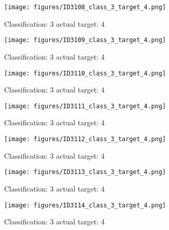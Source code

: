 \begin{figure}[h!]
\begin{center}
\texttt{[image: figures/ID3108\_class\_3\_target\_4.png]}
\end{center}
\caption{ Classification: 3 actual target: 4}
\label{fig:ID3108_class_3_target_4}
\end{figure}
\begin{figure}[h!]
\begin{center}
\texttt{[image: figures/ID3109\_class\_3\_target\_4.png]}
\end{center}
\caption{ Classification: 3 actual target: 4}
\label{fig:ID3109_class_3_target_4}
\end{figure}
\begin{figure}[h!]
\begin{center}
\texttt{[image: figures/ID3110\_class\_3\_target\_4.png]}
\end{center}
\caption{ Classification: 3 actual target: 4}
\label{fig:ID3110_class_3_target_4}
\end{figure}
\begin{figure}[h!]
\begin{center}
\texttt{[image: figures/ID3111\_class\_3\_target\_4.png]}
\end{center}
\caption{ Classification: 3 actual target: 4}
\label{fig:ID3111_class_3_target_4}
\end{figure}
\begin{figure}[h!]
\begin{center}
\texttt{[image: figures/ID3112\_class\_3\_target\_4.png]}
\end{center}
\caption{ Classification: 3 actual target: 4}
\label{fig:ID3112_class_3_target_4}
\end{figure}
\begin{figure}[h!]
\begin{center}
\texttt{[image: figures/ID3113\_class\_3\_target\_4.png]}
\end{center}
\caption{ Classification: 3 actual target: 4}
\label{fig:ID3113_class_3_target_4}
\end{figure}
\begin{figure}[h!]
\begin{center}
\texttt{[image: figures/ID3114\_class\_3\_target\_4.png]}
\end{center}
\caption{ Classification: 3 actual target: 4}
\label{fig:ID3114_class_3_target_4}
\end{figure}
